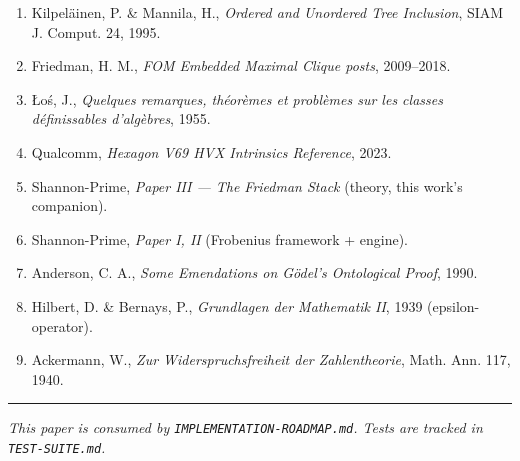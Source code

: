 \documentclass[
  11pt,
]{article}
\providecommand{\tightlist}{%
  \setlength{\itemsep}{0pt}\setlength{\parskip}{0pt}}
\begin{document}
\begin{enumerate}
\def\labelenumi{\arabic{enumi}.}
\tightlist
\item
  Kilpeläinen, P. \& Mannila, H., \emph{Ordered and Unordered Tree
  Inclusion}, SIAM J. Comput. 24, 1995.
\item
  Friedman, H. M., \emph{FOM Embedded Maximal Clique posts}, 2009--2018.
\item
  Łoś, J., \emph{Quelques remarques, théorèmes et problèmes sur les
  classes définissables d'algèbres}, 1955.
\item
  Qualcomm, \emph{Hexagon V69 HVX Intrinsics Reference}, 2023.
\item
  Shannon-Prime, \emph{Paper III --- The Friedman Stack} (theory, this
  work's companion).
\item
  Shannon-Prime, \emph{Paper I, II} (Frobenius framework + engine).
\item
  Anderson, C. A., \emph{Some Emendations on Gödel's Ontological Proof},
  1990.
\item
  Hilbert, D. \& Bernays, P., \emph{Grundlagen der Mathematik II}, 1939
  (epsilon-operator).
\item
  Ackermann, W., \emph{Zur Widerspruchsfreiheit der Zahlentheorie},
  Math. Ann. 117, 1940.
\end{enumerate}

\begin{center}\rule{0.5\linewidth}{0.5pt}\end{center}

\emph{This paper is consumed by \texttt{IMPLEMENTATION-ROADMAP.md}.
Tests are tracked in \texttt{TEST-SUITE.md}.}
\end{document}
